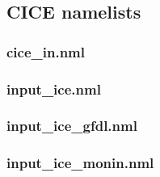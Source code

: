 \documentclass[11pt]{article}
\newcommand{\nmllink}[2]{#1} %
\newcommand{\nml}[1]{{\footnotesize\textsf{}}}
\begin{document}
\subsection{CICE namelists}\label{S:cice-namelist}
\renewcommand{\nmllink}[2]{\href{https://github.com/OceansAus/cice5/search?q=#2}{#1}} %
\subsubsection{cice\_in.nml}
\nml{cice_in_nml.tex}
\subsubsection{input\_ice.nml}
\nml{input_ice_nml.tex}
\subsubsection{input\_ice\_gfdl.nml}
\nml{input_ice_gfdl_nml.tex}
\subsubsection{input\_ice\_monin.nml}
\nml{input_ice_monin_nml.tex}

\end{document}
